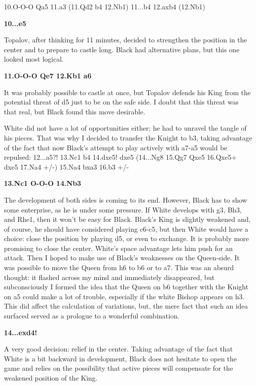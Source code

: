 \documentclass[
	11pt,twocolumn]{article}
\renewcommand{\bf}{\bfseries}
\begin{document}
10.O-O-O Qa5 11.a3 (11.Qd2 b4 12.Nb1) 11...b4 12.axb4 (12.Nb1) 

{\bf 10...e5 }

Topalov, after thinking for 11 minutes, decided to strengthen the position in the center and to prepare to castle long. Black had alternative plans, but this one looked most logical.

{\bf 11.O-O-O Qe7 12.Kb1 a6 }

It was probably possible to castle at once, but Topalov defends his King from the potential threat of d5 just to be on the safe side. I doubt that this threat was that real, but Black found this move desirable.



White did not have a lot of opportunities either; he had to unravel the tangle of his pieces. That was why I decided to transfer the Knight to b3, taking advantage of the fact that now Black's attempt to play actively with a7-a5 would be repulsed: 12...a5?! 13.Nc1 b4 14.dxe5! dxe5 (14...Ng8 15.Qg7 Qxe5 16.Qxe5+ dxe5 17.Na4 +/-) 15.Na4 bxa3 16.b3 +/-

{\bf 13.Nc1 O-O-O 14.Nb3 }

The development of both sides is coming to its end. However, Black has to show some enterprise, as he is under some pressure. If White develops with g3, Bh3, and Rhe1, then it won't be easy for Black. Black's King is slightly weakened and, of course, he should have considered playing c6-c5, but then White would have a choice: close the position by playing d5, or even to exchange. It is probably more promising to close the center. White's space advantage lets him push for an attack. Then I hoped to make use of Black's weaknesses on the Queen-side. It was possible to move the Queen from h6 to b6 or to a7. This was an absurd thought: it flashed across my mind and immediately disappeared, but subconsciously I formed the idea that the Queen on b6 together with the Knight on a5 could make a lot of trouble, especially if the white Bishop appears on h3. This did affect the calculation of variations, but, the mere fact that such an idea surfaced served as a prologue to a wonderful combination.

{\bf 14...exd4! }

A very good decision: relief in the center. Taking advantage of the fact that White is a bit backward in development, Black does not hesitate to open the game and relies on the possibility that active pieces will compensate for the weakened position of the King.
\end{document}
